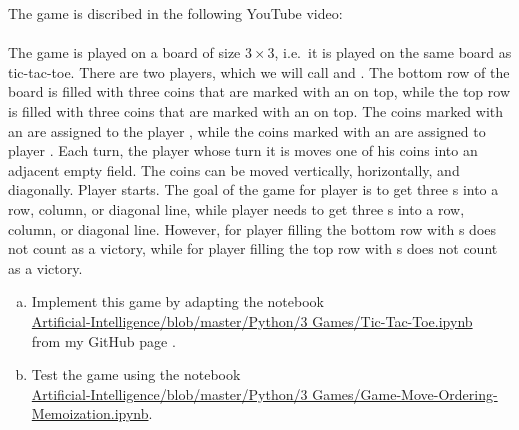 \exercise
The game  is discribed in the following YouTube video:
\\[0.2cm]
\hspace*{1.3cm}
\href{https://www.youtube.com/watch?v=R-aSW1MQwEo}{}
\\[0.2cm]
The game is played on a board of size $3 \times 3$, i.e.~it is played on the same board as tic-tac-toe.
There are two players, which we will call  and .  The bottom row of the board is filled
with three coins that are marked with an  on top, while the top row is filled with three coins that
are marked with an  on top.  The coins marked with an  are assigned to the player ,
while the coins marked with an  are assigned to player .
Each turn, the player whose turn it is moves one of his coins into an adjacent empty field.  The coins can be
moved vertically, horizontally, and diagonally. 
Player  starts.  The goal of the game for player  is to get three s into a row, column, or
diagonal line, while player  needs to get three s into a row, column, or diagonal line.  However, for
player  filling the bottom row with s does not count as a victory, while for player
  filling the top row with s does not count as a victory.
\begin{enumerate}[(a)]
\item Implement this game by adapting the notebook
      \\[0.2cm]
      \hspace*{1.3cm}
      \href{https://github.com/karlstroetmann/Artificial-Intelligence/blob/master/Python/3 Games/Tic-Tac-Toe.ipynb}{
            Artificial-Intelligence/blob/master/Python/3 Games/Tic-Tac-Toe.ipynb}
      \\[0.2cm]
      from my GitHub page .
\item Test the game using the notebook
      \\[0.2cm]
      \hspace*{1.3cm}
      \href{https://github.com/karlstroetmann/Artificial-Intelligence/blob/master/Python/3 Games/Game-Move-Ordering-Memoization.ipynb}{
           Artificial-Intelligence/blob/master/Python/3 Games/Game-Move-Ordering-Memoization.ipynb}.
      \eox
\end{enumerate}
\pagebreak


